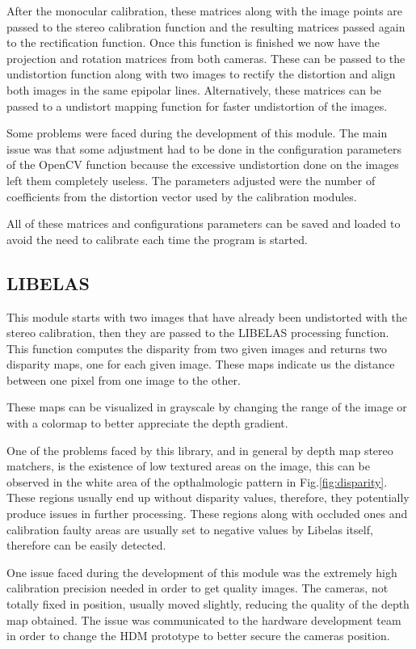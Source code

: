 \documentclass[10pt,a4paper,twocolumn,twoside]{article}
\begin{document}
	After the monocular calibration, these matrices along with the image points are passed to the stereo calibration function and the resulting matrices passed again to the rectification function. Once this function is finished we now have the projection and rotation matrices from both cameras. These can be passed to the undistortion function along with two images to rectify the distortion and align both images in the same epipolar lines. Alternatively, these matrices can be passed to a undistort mapping function for faster undistortion of the images.  
	
	Some problems were faced during the development of this module. The main issue was that some adjustment had to be done in the configuration parameters of the OpenCV function because the excessive undistortion done on the images left them completely useless. The parameters adjusted were the number of coefficients from the distortion vector used by the calibration modules. 
	
	All of these matrices and configurations parameters can be saved and loaded to avoid the need to calibrate each time the program is started.  
	
	\subsection{LIBELAS}
	\label{sec:libelas}
	 This module starts with two images that have already been undistorted with the stereo calibration, then they are passed to the LIBELAS processing function. This function computes the disparity from two given images and returns two disparity maps, one for each given image. These maps indicate us the distance between one pixel from one image to the other.  
	 
	 These maps can be visualized in grayscale by changing the range of the image or with a colormap to better appreciate the depth gradient. 
	 
	 One of the problems faced by this library, and in general by depth map stereo matchers, is the existence of low textured areas on the image, this can be observed in the white area of the opthalmologic pattern in Fig.\ref{fig:disparity}. These regions usually end up without disparity values, therefore, they potentially produce issues in further processing. These regions along with occluded ones and calibration faulty areas are usually set to negative values by Libelas itself, therefore can be easily detected.  
	 
	 One issue faced during the development of this module was the extremely high calibration precision needed in order to get quality images. The cameras, not totally fixed in position, usually moved slightly, reducing the quality of the depth map obtained. The issue was communicated to the hardware development team in order to change the HDM prototype to better secure the cameras position.  
	 
\end{document}
